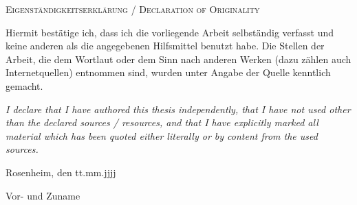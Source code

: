 {
\large
\thispagestyle{empty}
\vspace*{\fill}

\noindent
\textsc{Eigenständigkeitserklärung / Declaration of Originality}

\medskip

\noindent
Hiermit bestätige ich, dass ich die vorliegende Arbeit selbständig verfasst und keine anderen als die angegebenen Hilfsmittel benutzt habe. Die Stellen der Arbeit, die dem Wortlaut oder dem Sinn nach anderen Werken (dazu zählen auch Internetquellen) entnommen sind, wurden unter Angabe der Quelle kenntlich gemacht.

\medskip

\textit{I declare that I have authored this thesis independently, that I have not used other than the declared sources / resources, and that I have explicitly marked all material which has been quoted either literally or by content from the used sources.}

\bigskip

\noindent
Rosenheim, den tt.mm.jjjj

\vspace*{2cm}

\noindent
Vor- und Zuname
}

